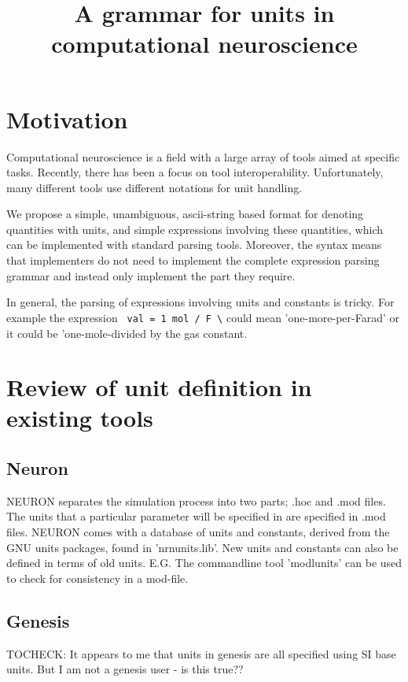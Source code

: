 \documentclass{article}
\title{A grammar for units in computational neuroscience}
\begin{document}
\maketitle

\section*{Motivation}

Computational neuroscience is a field with a large 
array of tools aimed at specific tasks. Recently, 
there has been a focus on tool interoperability. 
Unfortunately, many different tools use different 
notations for unit handling.

We propose a simple, unambiguous, ascii-string based format for denoting quantities with units, and 
simple expressions involving these quantities, which can be implemented with standard parsing tools. 
Moreover, the syntax means that implementers do not need to implement the complete expression parsing grammar 
and instead only implement the part they require.

In general, the parsing of expressions involving units and constants is tricky. For example the expression
\verb| val = 1 mol / F \| could mean 'one-more-per-Farad' or it could be 'one-mole-divided by the gas constant.


\section*{Review  of unit definition in existing tools}

\subsection*{Neuron}
NEURON separates the simulation process into two parts; .hoc and .mod files. The units that a particular parameter will be specified in are specified in .mod files. NEURON comes with a database of units and constants, derived from the GNU units packages, found in 'nrnunits.lib'. New units and constants can also be defined in terms of old units. E.G. The commandline tool 'modlunits' can be used to check for consistency in a mod-file.

\subsection*{Genesis}
TOCHECK: It appears to me that units in genesis are all specified using SI base units. But  I am not a genesis user - is this true??
\end{document}

